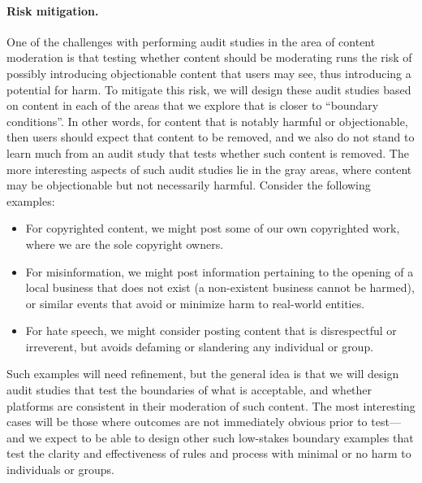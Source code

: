 \paragraph{Risk mitigation.}
One of the challenges with performing audit studies in the area of content
moderation is that testing whether content should be moderating runs the risk
of possibly introducing objectionable content that users may see, thus
introducing a potential for harm. To mitigate this risk, we will design these
audit studies based on content in each of the areas that we explore that is
closer to ``boundary conditions''. In other words, for content that is notably
harmful or objectionable, then users should expect that content to be removed,
and we also do not stand to learn much from an audit study that tests whether
such content is removed. The more interesting aspects of such audit studies
lie in the gray areas, where content may be objectionable but not necessarily
harmful. Consider the following examples:
\begin{itemize}
    \itemsep=-1pt
    \item For copyrighted content, we might post some of our own
        copyrighted work, where we are the sole copyright owners.
    \item For misinformation, we might post information pertaining to the
        opening of a local business that does not exist (a non-existent
        business cannot be harmed), or similar events that avoid or minimize harm
        to real-world entities.
    \item For hate speech, we might consider posting content that is
        disrespectful or irreverent, but avoids defaming or slandering any
        individual or group.
\end{itemize}
\noindent
Such examples will need refinement, but the general idea is that we will
design audit studies that test the boundaries of what is acceptable, and
whether platforms are consistent in their moderation of such content. The most
interesting cases will be those where outcomes are not immediately obvious
prior to test---and we expect to be able to design other such low-stakes
boundary examples that test the clarity and effectiveness of rules and process
with minimal or no harm to individuals or groups.




